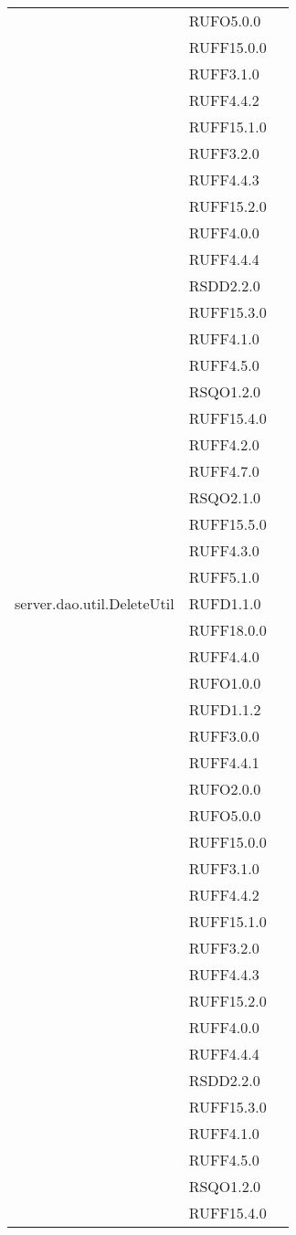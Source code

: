 \begin{center}
\begin{longtable}{lp{}l}
 & RUFO5.0.0 \\
 & RUFF15.0.0 \\
 & RUFF3.1.0 \\
 & RUFF4.4.2 \\
 & RUFF15.1.0 \\
 & RUFF3.2.0 \\
 & RUFF4.4.3 \\
 & RUFF15.2.0 \\
 & RUFF4.0.0 \\
 & RUFF4.4.4 \\
 & RSDD2.2.0 \\
 & RUFF15.3.0 \\
 & RUFF4.1.0 \\
 & RUFF4.5.0 \\
 & RSQO1.2.0 \\
 & RUFF15.4.0 \\
 & RUFF4.2.0 \\
 & RUFF4.7.0 \\
 & RSQO2.1.0 \\
 & RUFF15.5.0 \\
 & RUFF4.3.0 \\
 & RUFF5.1.0 \\
server.dao.util.DeleteUtil & RUFD1.1.0 \\
 & RUFF18.0.0 \\
 & RUFF4.4.0 \\
 & RUFO1.0.0 \\
 & RUFD1.1.2 \\
 & RUFF3.0.0 \\
 & RUFF4.4.1 \\
 & RUFO2.0.0 \\
 & RUFO5.0.0 \\
 & RUFF15.0.0 \\
 & RUFF3.1.0 \\
 & RUFF4.4.2 \\
 & RUFF15.1.0 \\
 & RUFF3.2.0 \\
 & RUFF4.4.3 \\
 & RUFF15.2.0 \\
 & RUFF4.0.0 \\
 & RUFF4.4.4 \\
 & RSDD2.2.0 \\
 & RUFF15.3.0 \\
 & RUFF4.1.0 \\
 & RUFF4.5.0 \\
 & RSQO1.2.0 \\
 & RUFF15.4.0 \\

\end{longtable}
\end{center}

